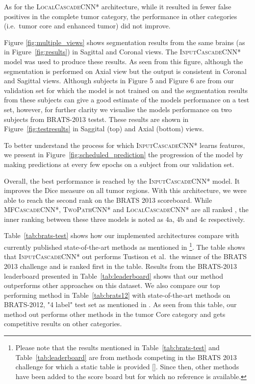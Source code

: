 \documentclass[final,5p,times,twocolumn]{elsarticle}
\begin{document}
{As for the \textsc{LocalCascadeCNN*} architecture, while it resulted in fewer false positives in the complete tumor category, the performance in other categories (i.e.\ tumor core and enhanced tumor) did not improve.

Figure \ref{fig:multiple_views} shows segmentation results from the same brains (as in Figure~\ref{fig:results}) in Sagittal and Coronal views. The \textsc{InputCascadeCNN*} model was used to produce these results. As seen from this figure, although the segmentation is performed on Axial view but the output is consistent in  Coronal and Sagittal views. Although subjects in Figure 5 and Figure 6 are from our validation set for which the model is not trained on and the segmentation results from these subjects can give a good estimate of the models performance on a test set, however, for further clarity we visualise the models performance on two subjects from BRATS-2013 testst. These results are shown in Figure~\ref{fig:testresults} in Saggital (top) and Axial (bottom) views.
 
To better understand the process for which \textsc{InputCascadeCNN*} learns features, we present in Figure~\ref{fig:scheduled_prediction} the progression of the model by making predictions at every few epochs on a subject from our validation set. 

Overall, the best performance is reached by the \textsc{InputCascadeCNN*} model. It improves the Dice measure on all tumor regions. With this architecture, we were able to reach the second rank on the BRATS 2013 scoreboard. While \textsc{MFCascadeCNN*}, \textsc{TwoPathCNN*} and \textsc{LocalCascadeCNN*} are all ranked , the inner ranking between these three models is noted as 4a, 4b and 4c respectively.  



Table~\ref{tab:brats-test} shows how our implemented architectures compare with currently published state-of-the-art methods as mentioned in \citep{Menze2014}\footnote{Please note that the results mentioned in Table~\ref{tab:brats-test} and Table~\ref{tab:leaderboard} are from methods competing in the BRATS 2013 challenge for which a static table is provided []. Since then, other methods have been added to the score board but for which no reference is available.}.  The table shows that \textsc{InputCascadeCNN*} out performs Tustison et al.\, the winner of the BRATS 2013 challenge and is ranked first in the table.  Results from the BRATS-2013 leaderboard presented in Table~\ref{tab:leaderboard}  shows that our method outperforms other approaches on this dataset. We also compare our top performing method in Table~\ref{tab:brats12} with state-of-the-art methods on BRATS-2012, "4 label" test set as mentioned in \citep{Menze2014}. As seen from this table, our method out performs other methods in the tumor Core category and gets competitive results on other categories.

}
\end{document}
